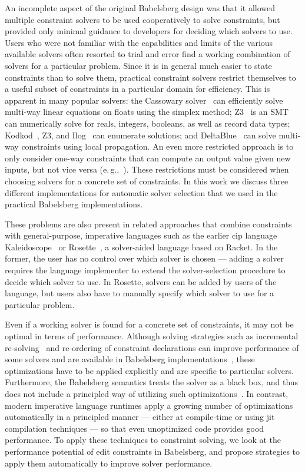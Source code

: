 \documentclass[numbers]{sigplanconf}
\newcommand{\ac}[1]{\gls{#1}}
\newcommand{\hairspace}{\,}
\newcommand{\eg}{e.\hairspace{}g.,\xspace}
\begin{document}
An incomplete aspect of the original Babelsberg design was that it allowed
multiple constraint solvers to be used cooperatively to solve constraints, but
provided only minimal guidance to developers for deciding which solvers to
use. Users who were not familiar with the capabilities and limits of the various
available solvers often resorted to trial and error find a working combination
of solvers for a particular problem. Since it is in general much easier to state
constraints than to solve them, practical constraint solvers restrict themselves
to a useful subset of constraints in a particular domain for efficiency. This is
apparent in many popular solvers: the Cassowary
solver~\cite{badros2001cassowary} can efficiently solve multi-way linear
equations on floats using the simplex method; Z3~\cite{de2008z3} is an SMT can
numerically solve for reals, integers, booleans, as well as record data types;
Kodkod~\cite{torlak2007kodkod}, Z3, and Ilog~\cite{puget1994c++} can enumerate
solutions; and DeltaBlue~\cite{freeman-benson-phoenix-1989} can solve multi-way
constraints using local propagation.  An even more restricted approach is to
only consider one-way constraints that can compute an output value given new
inputs, but not vice versa
(\eg~\cite{hudson-uist-1996,myers-ieee-computer-1990}). These restrictions must
be considered when choosing solvers for a concrete set of constraints. In this
work we discuss three different implementations for automatic solver selection
that we used in the practical Babelsberg implementations.

These problems are also present in related approaches that combine constraints
with general-purpose, imperative languages such as the earlier \ac{cip} language
Kaleidoscope~\cite{lopez-asi-1994} or
Rosette~\cite{Torlak:2013:GSL:2509578.2509586}, a solver-aided language based on
Racket. In the former, the user has no control over which solver is chosen ---
adding a solver requires the language implementer to extend the solver-selection
procedure to decide which solver to use. In Rosette, solvers can be added by
users of the language, but users also have to manually specify which solver to
use for a particular problem.

Even if a working solver is found for a concrete set of constraints, it may not
be optimal in terms of performance. Although solving strategies such as
incremental re-solving~\cite{freeman1990incremental} and re-ordering of
constraint declarations can improve performance of some solvers and are
available in Babelsberg implementations~\cite{felgentreff2014jot}, these
optimizations have to be applied explicitly and are specific to particular
solvers. Furthermore, the Babelsberg semantics treats the solver as a black box,
and thus does not include a principled way of utilizing such
optimizations~\cite{FelgentreffOOPSLA2015}. In contrast, modern imperative
language runtimes apply a growing number of optimizations automatically in a
principled manner --- either at compile-time or using \gls{jit} compilation
techniques --- so that even unoptimized code provides good performance. To apply
these techniques to constraint solving, we look at the performance potential of
edit constraints in Babelsberg, and propose strategies to apply them
automatically to improve solver performance.
\end{document}

